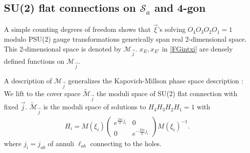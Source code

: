 \documentclass[aps,prd,notitlepage,nofootinbib,superscriptaddress,groupedaddress,twocolumn]{revtex4-1}
\def\C{\mathbb{C}}
\def\R{\mathbb{R}}
\def\be{\begin{eqnarray}}
\def\ee{\end{eqnarray}}
\newcommand{\cm}{\mathcal M}
\newcommand{\cs}{\mathcal S}
\newcommand{\sig}{\sigma}
\renewcommand{\o}{\omega}
\newcommand{\rmd}{\mathrm d}
\newcommand{\lt}{\left}
\newcommand{\rt}{\right}
\begin{document}
\subsection{SU(2) flat connections on $\cs_a$ and 4-gon}\label{Integration over PSU(2) flat conn}


A simple counting degrees of freedom shows that $\vec{\xi}$'s solving $O_4O_3O_2O_1=1$ modulo PSU(2) gauge transformations generically span real 2-dimensional space. This 2-dimensional space is denoted by $\cm_{\vec{j}}$. %
$x_E,x_{E'}$ in \eqref{FGintxi} are densely defined functions on $\cm_{\vec{j}}$.



A description of $\cm_{\vec{j}}$ \cite{Nekrasov:2011bc} generalizes the Kapovich-Millson phase space description \cite{polygon,polygon1}: We lift to the cover space $\widetilde{\cm}_{\vec{j}}$ the moduli space of SU(2) flat connection with fixed $\vec{j}$. $\widetilde{\cm}_{\vec{j}}$ is the moduli space of solutions to $H_4H_3H_2H_1=1$ with 
\be
H_i= M(\xi_i)\left(\begin{array}{cc}
	e^{\frac{2\pi i}{k}j_i} & 0 \\
  0 &  e^{-\frac{2\pi i}{k}j_i}
  \end{array}\right)M(\xi_i)^{-1}.\nonumber
\ee
where $j_i=j_{ab}$ of annuli $\ell_{ab}$ connecting to the holes.



\end{document}
